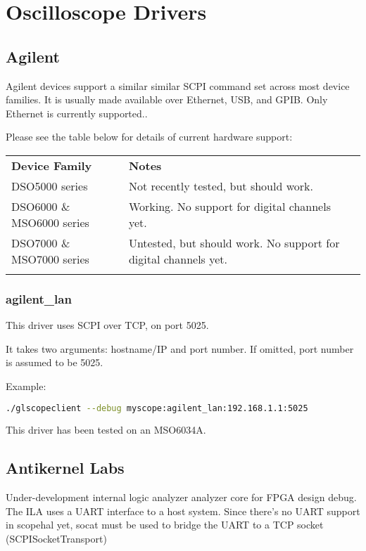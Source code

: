 \section{Oscilloscope Drivers}
\label{sec:drivers}

\subsection{Agilent}

Agilent devices support a similar similar SCPI command set across most device families. It is usually made available over Ethernet, USB, and GPIB. Only Ethernet is currently supported..

Please see the table below for details of current hardware support:

\begin{tabularx}{16cm}{llX}
\thickhline
\textbf{Device Family} & \textbf{Notes} \\
\thickhline
DSO5000 series & Not recently tested, but should work.\\
\thickhline
DSO6000 \& MSO6000 series & Working. No support for digital channels yet.\\
\thickhline
DSO7000 \& MSO7000 series & Untested, but should work. No support for digital channels yet.\\
\thickhline
\end{tabularx}

\subsubsection{agilent\_lan}

This driver uses SCPI over TCP, on port 5025.

It takes two arguments: hostname/IP and port number. If omitted, port number is assumed to be 5025.

Example:
\begin{lstlisting}[language=sh]
./glscopeclient --debug myscope:agilent_lan:192.168.1.1:5025
\end{lstlisting}

This driver has been tested on an MSO6034A.

\subsection{Antikernel Labs}

Under-development internal logic analyzer analyzer core for FPGA design debug. The ILA uses a UART interface to a host
system. Since there's no UART support in scopehal yet, socat must be used to bridge the UART to a TCP socket
(SCPISocketTransport)

